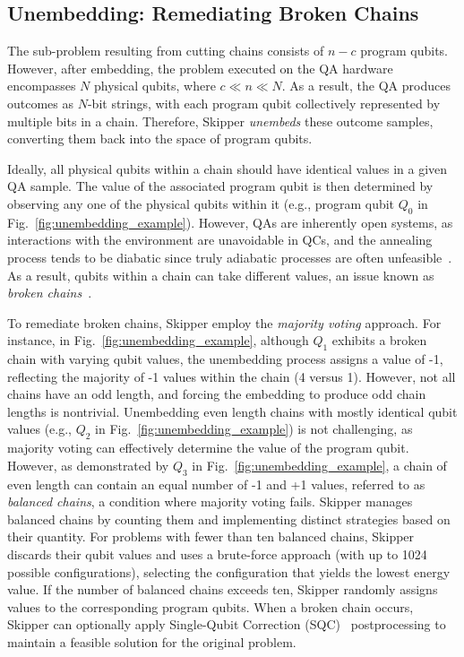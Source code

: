 \subsection{Unembedding: Remediating Broken Chains}

The sub-problem resulting from cutting chains consists of $n-c$ program qubits.
However, after embedding, the problem executed on the QA hardware encompasses $N$ physical qubits, where $c \ll n \ll N$.
As a result, the QA produces outcomes as $N$-bit strings, with each program qubit collectively represented by multiple bits in a chain.
Therefore, Skipper \emph{unembeds} these outcome samples, converting them back into the space of program qubits.

Ideally, all physical qubits within a chain should have identical values in a given QA sample. 
The value of the associated program qubit is then determined by observing any one of the physical qubits within it (e.g., program qubit $Q_0$ in Fig.~\ref{fig:unembedding_example}).
However, QAs are inherently open systems, as interactions with the environment are unavoidable in QCs, and the annealing process tends to be diabatic since truly adiabatic processes are often unfeasible~\cite{ayanzadeh2021multi}.
As a result, qubits within a chain can take different values, an issue known as \emph{broken chains}~\cite{grant2022benchmarking,pelofske2020advanced,king2014algorithm,barbosa2021optimizing}.

To remediate broken chains, Skipper employ the \emph{majority voting} approach. %
For instance, in Fig.~\ref{fig:unembedding_example}, although $Q_1$ exhibits a broken chain with varying qubit values, the unembedding process assigns a value of -1, reflecting the majority of -1 values within the chain (4 versus 1).
However, not all chains have an odd length, and forcing the embedding to produce odd chain lengths is nontrivial.
Unembedding even length chains with mostly identical qubit values (e.g., $Q_2$ in Fig.~\ref{fig:unembedding_example}) is not challenging, as majority voting can effectively determine the value of the program qubit.
However, as demonstrated by $Q_3$ in Fig.~\ref{fig:unembedding_example}, a chain of even length can contain an equal number of -1 and +1 values, referred to as \emph{balanced chains}, a condition where majority voting fails.
Skipper manages balanced chains by counting them and implementing distinct strategies based on their quantity. 
For problems with fewer than ten balanced chains, Skipper discards their qubit values and uses a brute-force approach (with up to 1024 possible configurations), selecting the configuration that yields the lowest energy value. 
If the number of balanced chains exceeds ten, Skipper randomly assigns values to the corresponding program qubits. 
When a broken chain occurs, Skipper can optionally apply Single-Qubit Correction (SQC)~\cite{ayanzadeh2021multi,ayanzadeh2022equal} postprocessing to maintain a feasible solution for the original problem.


